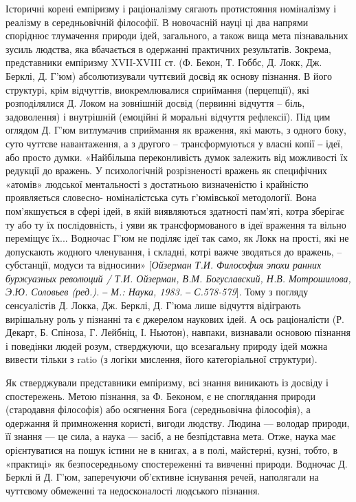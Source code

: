 Історичні корені емпіризму і раціоналізму сягають протистояння
номіналізму і реалізму в середньовічній філософії. В новочасній науці ці два
напрями споріднює тлумачення природи ідей, загального, а також вища мета
пізнавальних зусиль людства, яка вбачається в одержанні практичних
результатів. Зокрема, представники емпіризму XVII-XVIII ст. (Ф. Бекон, Т.
Гоббс, Д. Локк, Дж. Берклі, Д. Г’юм) абсолютизували чуттєвий досвід як
основу пізнання. В його структурі, крім відчуттів, виокремлювалися
сприймання (перцепції), які розподілялися Д. Локом на зовнішній досвід
(первинні відчуття – біль, задоволення) і внутрішній (емоційні й моральні
відчуття рефлексії). Під цим оглядом Д. Г’юм витлумачив сприймання як
враження, які мають, з одного боку, суто чуттєве навантаження, а з другого –
трансформуються у власні копії ‒ ідеї, або просто думки. «Найбільша
переконливість думок залежить від можливості їх редукції до вражень. У
психологічній розрізненості вражень як специфічних «атомів» людської
ментальності з достатньою визначеністю і крайністю проявляється словесно-
номіналістська суть г’юмівської методології. Вона пом’якшується в сфері ідей,
в якій виявляються здатності пам’яті, котра зберігає ту або ту їх послідовність, і
уяви як трансформованого в ідеї враження та вільно переміщує їх... Водночас
Г’юм не поділяє ідеї так само, як Локк на прості, які не допускають жодного
членування, і складні, котрі важче зводяться до вражень, – субстанції, модуси
та відносини» [\textit{Ойзерман Т.И. Философия эпохи ранних буржуазных революций
/ Т.И. Ойзерман, В.М. Богуславский, Н.В. Мотрошилова, Э.Ю. Соловьев (ред.). ‒
М.: Наука, 1983. ‒ С.578-579}]. Тому з погляду сенсуалістів Д. Локка, Дж.
Берклі, Д. Г’юма лише відчуття відіграють вирішальну роль у пізнанні та є
джерелом наукових ідей. А ось раціоналісти (Р. Декарт, Б. Спіноза, Г. Лейбніц,
І. Ньютон), навпаки, визнавали основою пізнання і поведінки людей розум,
стверджуючи, що всезагальну природу ідей можна вивести тільки з ratio (з
логіки мислення, його категоріальної структури).

Як стверджували представники емпіризму, всі знання виникають із досвіду і
спостережень. Метою пізнання, за Ф. Беконом, є не споглядання природи
(стародавня філософія) або осягнення Бога (середньовічна філософія), а
одержання й примноження користі, вигоди людству. Людина --- володар
природи, її знання --- це сила, а наука --- засіб, а не безпідставна мета. Отже,
наука має орієнтуватися на пошук істини не в книгах, а в полі, майстерні, кузні,
тобто, в «практиці» як безпосередньому спостереженні та вивченні природи.
Водночас Д. Берклі й Д. Г’юм, заперечуючи об’єктивне існування речей,
наполягали на чуттєвому обмеженні та недосконалості людського пізнання.


